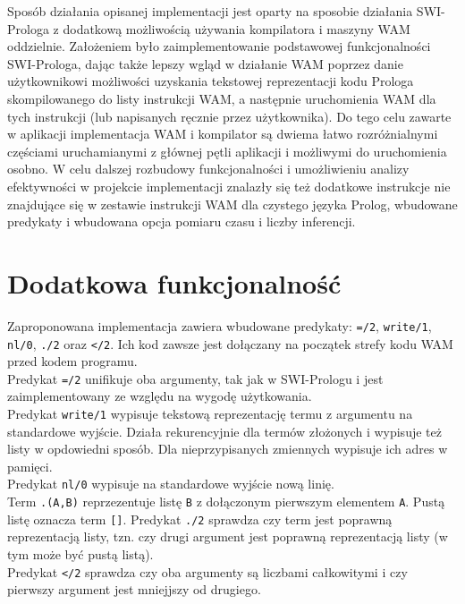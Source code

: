 Sposób działania opisanej implementacji jest oparty na sposobie działania SWI-Prologa z dodatkową możliwością używania kompilatora i maszyny WAM oddzielnie. Założeniem było zaimplementowanie podstawowej funkcjonalności SWI-Prologa, dając także lepszy wgląd w działanie WAM poprzez danie użytkownikowi możliwości uzyskania tekstowej reprezentacji kodu Prologa skompilowanego do listy instrukcji WAM, a następnie uruchomienia WAM dla tych instrukcji (lub napisanych ręcznie przez użytkownika). Do tego celu zawarte w aplikacji implementacja WAM i kompilator są dwiema łatwo rozróżnialnymi częściami uruchamianymi z głównej pętli aplikacji i możliwymi do uruchomienia osobno. W celu dalszej rozbudowy funkcjonalności i umożliwieniu analizy efektywności w projekcie implementacji znalazły się też dodatkowe instrukcje nie znajdujące się w zestawie instrukcji WAM dla czystego języka Prolog, wbudowane predykaty i wbudowana opcja pomiaru czasu i liczby inferencji.

\section{Dodatkowa funkcjonalność}

Zaproponowana implementacja zawiera wbudowane predykaty: \texttt{=/2}, \texttt{write/1}, \texttt{nl/0}, \texttt{./2} oraz \texttt{</2}. Ich kod zawsze jest dołączany na początek strefy kodu WAM przed kodem programu.\\
Predykat \texttt{=/2} unifikuje oba argumenty, tak jak w SWI-Prologu i jest zaimplementowany ze względu na wygodę użytkowania.\\
Predykat \texttt{write/1} wypisuje tekstową reprezentację termu z argumentu na standardowe wyjście. Działa rekurencyjnie dla termów złożonych i wypisuje też listy w opdowiedni sposób. Dla nieprzypisanych zmiennych wypisuje ich adres w pamięci.\\
Predykat \texttt{nl/0} wypisuje na standardowe wyjście nową linię.\\
Term \texttt{.(A,B)} reprzezentuje listę \texttt{B} z dołączonym pierwszym elementem \texttt{A}. Pustą listę oznacza term \texttt{[]}. Predykat \texttt{./2} sprawdza czy term jest poprawną reprezentacją listy, tzn. czy drugi argument jest poprawną reprezentacją listy (w tym może być pustą listą).\\
Predykat \texttt{</2} sprawdza czy oba argumenty są liczbami całkowitymi i czy pierwszy argument jest mniejjszy od drugiego.\\

